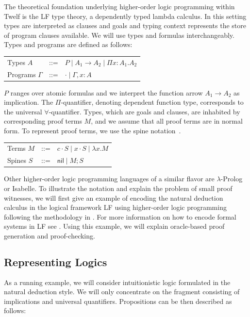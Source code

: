 \documentclass{acmconf}
\newcommand{\comb}{\cdot}
\newcommand{\nil}{\mathsf{nil}}
\begin{document}
The theoretical foundation underlying higher-order logic programming
within Twelf is the LF type theory, a dependently typed lambda
calculus. In this setting types are interpreted as clauses and goals and
typing context represents the store of program clauses available. We
will use types and formulas interchangeably. Types and programs are
defined as follows: 

\begin{center}
\begin{tabular}[h]{lcl}
Types  $A$ & ::= & $P \mid  A_1 \rightarrow A_2 \mid \Pi x:A_1.A_2$ \\
Programs  $\Gamma$ & ::= & $\cdot \mid \Gamma, x:A$ 
\end{tabular}
\end{center}

$P$ ranges over atomic formulas and we interpret the function arrow
$A_1 \rightarrow A_2$ as implication. The $\Pi$-quantifier, denoting
dependent function type, corresponds to the universal
$\forall$-quantifier. Types, which are goals and clauses, are
inhabited by corresponding proof terms $M$, and we assume that all
proof terms are in normal form. To represent proof terms, we use the
spine notation~\cite{CervesatoPfenning01}.

\begin{center}
\begin{tabular}[h]{lcl}
Terms  $M$ & ::= & $c \comb S \mid x \comb S \mid \lambda x. M $  \\ 
Spines $S$ & ::= & $\nil \mid M;S\;$
\end{tabular}
\end{center}

Other higher-order logic programming languages of a similar
flavor are $\lambda$-Prolog \cite{Nadathur99cade} or
Isabelle\cite{Paulson86}. To illustrate the notation and explain the
problem of small proof witnesses, we will first give an example of
encoding the natural deduction calculus in the logical framework LF
using higher-order logic programming following the methodology in
\cite{Harper93jacm}. For more information on how to encode formal
systems in LF see \cite{Pfenning97}.  Using this example, we will
explain oracle-based proof generation and proof-checking.  

\subsection{Representing Logics}
As a running example, we will consider intuitionistic logic formulated
in the natural deduction style. We will only concentrate on the fragment
consisting of implications and universal quantifiers. Propositions can
be then described as follows:
\end{document}

